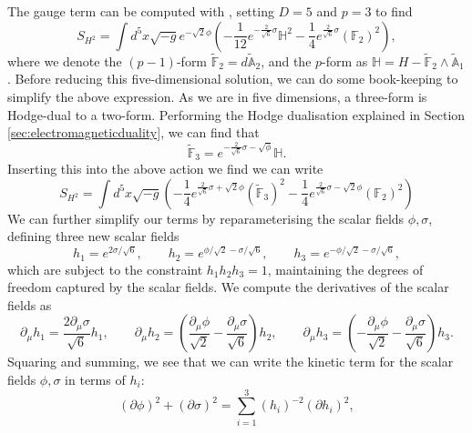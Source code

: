 The gauge term can be computed with , setting $D=5$ and $p = 3$ to find
\begin{equation*}
	S_{H^2} = \int d^5x \sqrt{-g} e^{-\sqrt{2}\phi} \left(-\frac{1}{12}e^{-\frac{2}{\sqrt{6}}\sigma} \mathbb{H}^2 -\frac{1}{4}e^{\frac{2}{\sqrt{6}}\sigma} (\mathbb{F}_2)^2 \right),
\end{equation*}
where we denote the $(p-1)$-form $\tilde{\mathbb{F}}_2 = d\tilde{\mathbb{A}}_2$, and the $p$-form as $\mathbb{H} = H - \tilde{\mathbb{F}}_2 \wedge \tilde{\mathbb{A}}_1$. Before reducing this five-dimensional solution, we can do some book-keeping to simplify the above expression. As we are in five dimensions, a three-form is Hodge-dual to a two-form. Performing the Hodge dualisation explained in Section \ref{sec:electromagneticduality}, we can find that
\begin{equation*}
	\tilde{\mathbb{F}}_3 = e^{- \frac{2}{\sqrt{6}} \sigma - \sqrt{\phi}} \mathbb{H}.
\end{equation*} 
Inserting this into the above action we find we can write
\begin{equation*}
	S_{H^2} = \int d^5x \sqrt{-g} \left(-\frac{1}{4}e^{\frac{2}{\sqrt{6}}\sigma+\sqrt{2}\phi} (\tilde{\mathbb{F}}_3)^2 -\frac{1}{4}e^{\frac{2}{\sqrt{6}}\sigma-\sqrt{2}\phi} (\mathbb{F}_2)^2 \right)
\end{equation*}
We can further simplify our terms by reparameterising the scalar fields $\phi, \sigma$, defining three new scalar fields
\begin{equation*}
    h_1 = e^{2 \sigma/\sqrt{6}}, \qquad  h_2 = e^{\phi/\sqrt{2} -  \sigma/\sqrt{6}}, \qquad h_3 = e^{-\phi/\sqrt{2} -  \sigma/\sqrt{6}},
\end{equation*}
which are subject to the constraint $h_1 h_2 h_3 = 1$, maintaining the degrees of freedom captured by the scalar fields. We compute the derivatives of the scalar fields as
\begin{equation*}
        \partial_\mu h_1 = \frac{2 \partial_\mu \sigma}{\sqrt{6}} h_1, \qquad \partial_\mu h_2 = \left(\frac{\partial_\mu \phi}{\sqrt{2}} - \frac{ \partial_\mu \sigma}{\sqrt{6}}\right)h_2, \qquad \partial_\mu h_3 = \left(-\frac{\partial_\mu \phi}{\sqrt{2}} - \frac{ \partial_\mu \sigma}{\sqrt{6}}\right)h_3.
\end{equation*}
Squaring and summing, we see that we can write the kinetic term for the scalar fields $\phi, \sigma$ in terms of $h_i$:
\begin{equation*}
       (\partial \phi)^2 + (\partial \sigma)^2  = \sum_{i=1}^3  (h_i)^{-2} (\partial h_i)^2,
\end{equation*}
